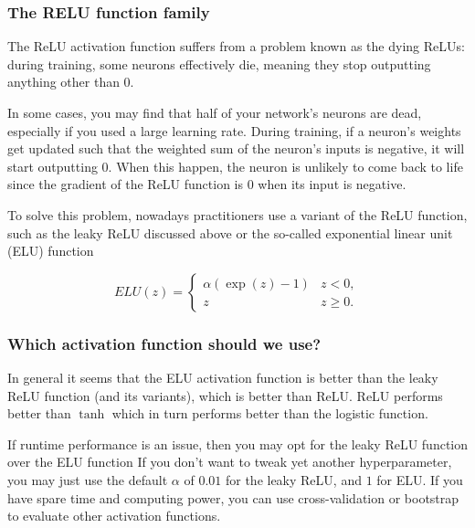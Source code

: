 \documentclass{beamer}
\begin{document}
\begin{frame}
\frametitle{The RELU function family}

The ReLU activation function suffers from a problem known as the dying
ReLUs: during training, some neurons effectively die, meaning they
stop outputting anything other than 0.

In some cases, you may find that half of your network’s neurons are
dead, especially if you used a large learning rate. During training,
if a neuron’s weights get updated such that the weighted sum of the
neuron’s inputs is negative, it will start outputting 0. When this
happen, the neuron is unlikely to come back to life since the gradient
of the ReLU function is 0 when its input is negative.

To solve this problem, nowadays practitioners use a variant of the
ReLU function, such as the leaky ReLU discussed above or the so-called
exponential linear unit (ELU) function

\[
ELU(z) = \left\{\begin{array}{cc} \alpha\left( \exp{(z)}-1\right) & z < 0,\\  z & z \ge 0.\end{array}\right. 
\]
\end{frame}

\begin{frame}
\frametitle{Which activation function should we use?}

In general it seems that the ELU activation function is better than
the leaky ReLU function (and its variants), which is better than
ReLU. ReLU performs better than $\tanh$ which in turn performs better
than the logistic function.

If runtime performance is an issue, then you may opt for the leaky
ReLU function over the ELU function If you don’t want to tweak yet
another hyperparameter, you may just use the default $\alpha$ of
$0.01$ for the leaky ReLU, and $1$ for ELU. If you have spare time and
computing power, you can use cross-validation or bootstrap to evaluate
other activation functions.
\end{frame}
\end{document}
